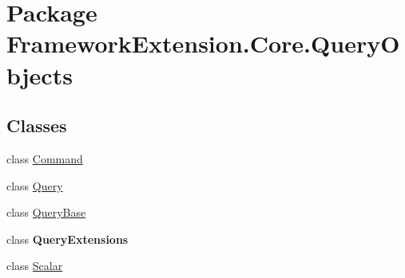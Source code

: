 \hypertarget{namespace_framework_extension_1_1_core_1_1_query_objects}{\section{Package Framework\-Extension.\-Core.\-Query\-Objects}
\label{namespace_framework_extension_1_1_core_1_1_query_objects}
}
\subsection*{Classes}
\begin{DoxyCompactItemize}
\item 
class \hyperlink{class_framework_extension_1_1_core_1_1_query_objects_1_1_command}{Command}
\item 
class \hyperlink{class_framework_extension_1_1_core_1_1_query_objects_1_1_query-g}{Query}
\item 
class \hyperlink{class_framework_extension_1_1_core_1_1_query_objects_1_1_query_base}{Query\-Base}
\item 
class {\bfseries Query\-Extensions}
\item 
class \hyperlink{class_framework_extension_1_1_core_1_1_query_objects_1_1_scalar-g}{Scalar}
\end{DoxyCompactItemize}
